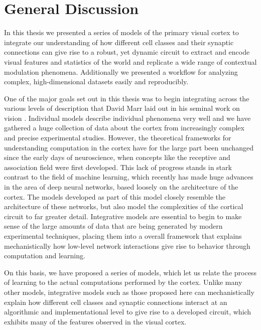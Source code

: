 \chapter{General Discussion}

In this thesis we presented a series of models of the primary visual
cortex to integrate our understanding of how different cell classes
and their synaptic connections can give rise to a robust, yet dynamic
circuit to extract and encode visual features and statistics of the
world and replicate a wide range of contextual modulation
phenomena. Additionally we presented a workflow for analyzing complex,
high-dimensional datasets easily and reproducibly.

One of the major goals set out in this thesis was to begin integrating
across the various levels of description that David Marr laid out in
his seminal work on vision \citep{Marr1982}. Individual models
describe individual phenomena very well and we have gathered a huge
collection of data about the cortex from increasingly complex and precise
experimental studies.  However, the theoretical frameworks for understanding computation in the
cortex have for the large part been unchanged since the early days of
neuroscience, when concepts like the receptive and association field
were first developed. This lack of progress stands in stark contrast to the field of
machine learning, which recently has made huge advances in the area of
deep neural networks, based loosely on the architecture of the
cortex. The models developed as part of this model closely resemble
the architecture of these networks, but also model the complexities of
the cortical circuit to far greater detail. Integrative models are
essential to begin to make sense of the large amounts of data that are
being generated by modern experimental techniques, placing them into
a overall framework that explains mechanistically how low-level
network interactions give rise to behavior through computation and
learning.

On this basis, we have proposed a series of models, which let us relate
the process of learning to the actual computations performed by the
cortex. Unlike many other models, integrative models such as those
proposed here can mechanistically explain how different cell classes
and synaptic connections interact at an algorithmic and
implementational level to give rise to a developed circuit, which
exhibits many of the features observed in the visual cortex.

